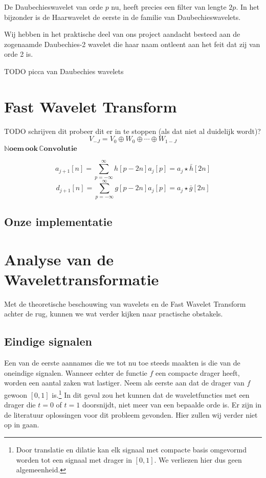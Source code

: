 \documentclass[11pt]{report}
\newcommand{\N}{\mathbb{N}}
\newcommand{\C}{\mathbb{C}}
\theoremstyle{plain}
\theoremstyle{remark}
\begin{document}
De Daubechieswavelet van orde $p$ nu, heeft precies een filter van lengte $2p$. In het bijzonder is de Haarwavelet de eerste in de familie van Daubechieswavelets.

Wij hebben in het praktische deel van ons project aandacht besteed aan de zogenaamde Daubechies-2 wavelet die haar naam ontleent aan het feit dat zij van orde 2 is.

TODO picca van Daubechies wavelets

\section{Fast Wavelet Transform}
TODO schrijven dit
probeer dit er in te stoppen (als dat niet al duidelijk wordt)?
\[
	V_{-J} = V_0 \oplus W_0 \oplus \cdots \oplus W_{1-J}
\]
$\boldsymbol{\N oem\, ook\, \C onvolutie}$

\begin{equation}
\label{approx}
	a_{j+1}[n] = \sum_{p=-\infty}^\infty h[p-2n] a_j[p] = a_j \star \bar{h}[2n]
\end{equation}
\begin{equation}
\label{detail}
	d_{j+1}[n] = \sum_{p=-\infty}^\infty g[p-2n] a_j[p] = a_j \star \bar{g}[2n]
\end{equation}

\subsection{Onze implementatie}

\section{Analyse van de Wavelettransformatie}
Met de theoretische beschouwing van wavelets en de Fast Wavelet Transform achter de rug, kunnen we wat verder kijken naar practische obstakels.

\subsection{Eindige signalen} 
Een van de eerste aannames die we tot nu toe steeds maakten is die van de oneindige signalen. Wanneer echter de functie $f$ een compacte drager heeft, worden een aantal zaken wat lastiger. Neem als eerste aan dat de drager van $f$ gewoon $[0,1]$ is.\footnote{Door translatie en dilatie kan elk signaal met compacte basis omgevormd worden tot een signaal met drager in $[0,1]$. We verliezen hier dus geen algemeenheid.} In dit geval zou het kunnen dat de waveletfuncties met een drager die $t=0$ of $t=1$ doorsnijdt, niet meer van een bepaalde orde is. Er zijn in de literatuur oplossingen voor dit probleem gevonden. Hier zullen wij verder niet op in gaan.
\end{document}

